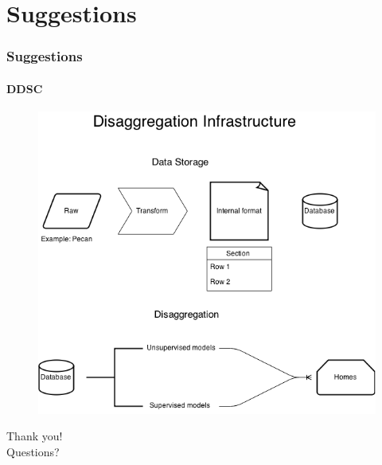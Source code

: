 \documentclass[gray]{beamer}
\begin{document}
\section{Suggestions}
\begin{frame}
	\frametitle{Suggestions}
	\framesubtitle{DDSC}
	\begin{figure}
		\includegraphics[scale=.36]{./figures/greenelyDisaggregation}
	\end{figure}
\end{frame}
\begin{frame}
\begin{center}
\huge
Thank you!
\normalsize \\
\vspace{0.3in}
Questions?
\end{center}
\end{frame}

\egroup
\end{document}
